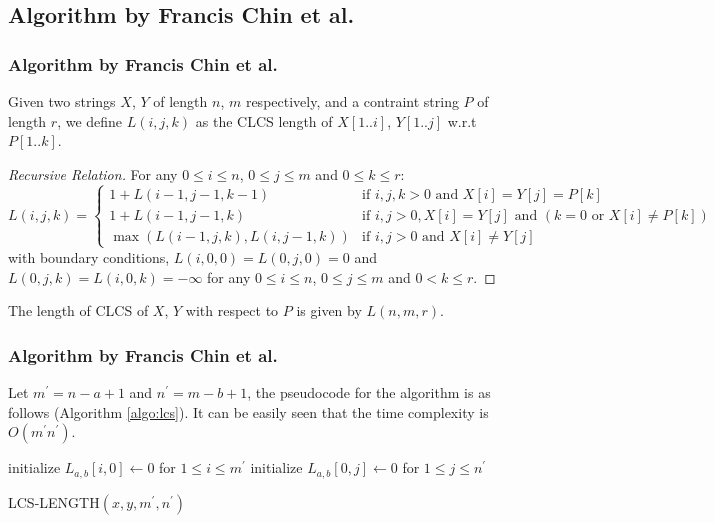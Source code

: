 \documentclass[10pt]{beamer}
\begin{document}
\subsection{Algorithm by Francis Chin et al.}
\begin{frame}
  \frametitle{Algorithm by Francis Chin et al.}
  Given two  strings $X$, $Y$ of length $n$, $m$ respectively, and  a contraint string $P$ of length $r$, we define $L(i, j, k)$ as the CLCS length of $X[1..i]$,  $Y[1..j]$ w.r.t $P[1..k]$.

  \pause
  \begin{proof}[Recursive Relation]
    For any $0\le i \le n$, $0\le j\le m$ and $0\le k \le r$:
    {\scriptsize{
        \begin{equation}\label{eq:recur}
          L(i,j,k)=\left\{
          \begin{array}{ll}
            1+ L(i-1, j-1, k-1) & \textrm{if } i, j, k > 0 \textrm{ and } X[i]= Y[j] = P[k]\\
            1+ L(i-1, j-1, k)    & \textrm{if } i, j > 0, X[i]=Y[j] \textrm{ and } (k=0 \textrm{ or } X[i]\neq P[k])\\
            \max(L(i-1, j, k), L(i, j-1, k)) & \textrm{if } i, j > 0 \textrm{ and } X[i]\neq Y[j]
          \end{array}
          \right.
        \end{equation}
      }
    }
    with boundary conditions, $L(i, 0, 0)=L(0, j, 0)=0$ and $L(0, j, k)= L(i, 0, k)=-\infty$ for any $0\le i \le n$, $0\le j\le m$ and $0< k \le r$.
  \end{proof}
  
  \vskip10pt
  \pause
  The length of CLCS of $X$, $Y$ with respect to $P$ is given by $L(n,m,r)$. 

\end{frame}

\begin{frame}
  \frametitle{Algorithm by Francis Chin et al.}
Let $m^{\prime} = n-a+1$ and $n^{\prime} = m-b+1$, the pseudocode for the algorithm is as follows (Algorithm \ref{algo:lcs}).
It can be easily seen that the time complexity is $O(m^{\prime}n^{\prime})$. 

\begin{algorithm}[H]
  \SetLine
  initialize $L_{a,b}[i, 0] \gets 0$ for $1\le i\le m^{\prime}$
  initialize $L_{a,b}[0, j] \gets 0$ for  $1\le j\le n^{\prime}$ 

   {
     {
    }
  }

  \caption{LCS-LENGTH$(x, y, m^{\prime}, n^{\prime})$}
  \label{algo:lcs}
\end{algorithm}

\end{frame}
\end{document}
